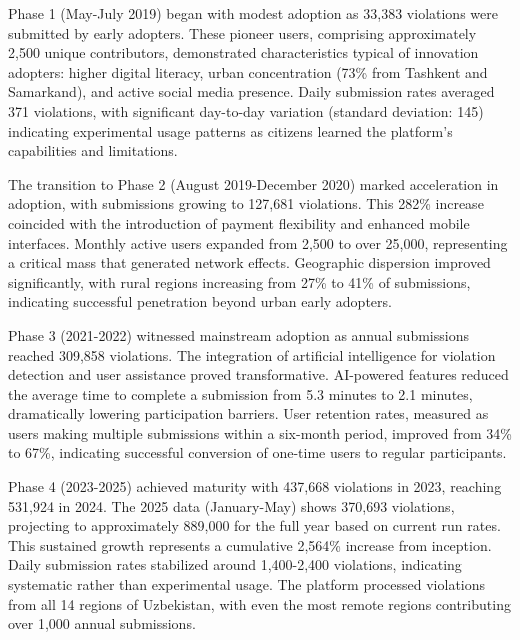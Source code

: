 \documentclass[pdflatex,sn-mathphys-num]{sn-jnl}%
\theoremstyle{thmstyleone}%
\theoremstyle{thmstyletwo}%
\theoremstyle{thmstylethree}%
\begin{document}
Phase 1 (May-July 2019) began with modest adoption as 33,383 violations were submitted by early adopters. These pioneer users, comprising approximately 2,500 unique contributors, demonstrated characteristics typical of innovation adopters: higher digital literacy, urban concentration (73\% from Tashkent and Samarkand), and active social media presence. Daily submission rates averaged 371 violations, with significant day-to-day variation (standard deviation: 145) indicating experimental usage patterns as citizens learned the platform's capabilities and limitations.

The transition to Phase 2 (August 2019-December 2020) marked acceleration in adoption, with submissions growing to 127,681 violations. This 282\% increase coincided with the introduction of payment flexibility and enhanced mobile interfaces. Monthly active users expanded from 2,500 to over 25,000, representing a critical mass that generated network effects. Geographic dispersion improved significantly, with rural regions increasing from 27\% to 41\% of submissions, indicating successful penetration beyond urban early adopters.

Phase 3 (2021-2022) witnessed mainstream adoption as annual submissions reached 309,858 violations. The integration of artificial intelligence for violation detection and user assistance proved transformative. AI-powered features reduced the average time to complete a submission from 5.3 minutes to 2.1 minutes, dramatically lowering participation barriers. User retention rates, measured as users making multiple submissions within a six-month period, improved from 34\% to 67\%, indicating successful conversion of one-time users to regular participants.

Phase 4 (2023-2025) achieved maturity with 437,668 violations in 2023, reaching 531,924 in 2024. The 2025 data (January-May) shows 370,693 violations, projecting to approximately 889,000 for the full year based on current run rates. This sustained growth represents a cumulative 2,564\% increase from inception. Daily submission rates stabilized around 1,400-2,400 violations, indicating systematic rather than experimental usage. The platform processed violations from all 14 regions of Uzbekistan, with even the most remote regions contributing over 1,000 annual submissions.
\end{document}
